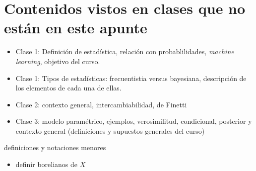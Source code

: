 

\chapter*{Contenidos vistos en clases que no están en este apunte}

\begin{itemize}
	\item Clase 1: Definición de estadística, relación con probablilidades, \textit{machine learning}, objetivo del curso. 
	\item Clase 1: Tipos de estadísticas: frecuentistia versus bayesiana, descripción de los elementos de cada una de ellas.
	\item Clase 2: contexto general, intercambiabilidad, de Finetti
	\item Clase 3: modelo paramétrico, ejemplos, verosimilitud, condicional, posterior y contexto general (definiciones y supuestos generales del curso)
\end{itemize}

definiciones y notaciones menores

\begin{itemize}
	\item definir borelianos de $X$
\end{itemize}